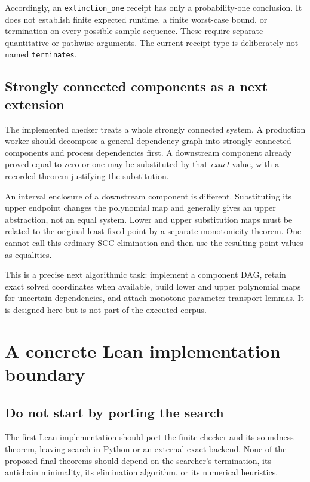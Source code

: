 \documentclass[11pt,a4paper]{article}
\theoremstyle{definition}\newtheorem{definition}[theorem]{Definition}
\theoremstyle{remark}\newtheorem{remark}[theorem]{Remark}
\newcommand{\code}[1]{\nolinkurl{#1}}
\begin{document}
Accordingly, an \code{extinction_one} receipt has only a probability-one conclusion. It does not establish finite expected runtime, a finite worst-case bound, or termination on every possible sample sequence. These require separate quantitative or pathwise arguments. The current receipt type is deliberately not named \code{terminates}.

\subsection{Strongly connected components as a next extension}
The implemented checker treats a whole strongly connected system. A production worker should decompose a general dependency graph into strongly connected components and process dependencies first. A downstream component already proved equal to zero or one may be substituted by that \emph{exact} value, with a recorded theorem justifying the substitution.

An interval enclosure of a downstream component is different. Substituting its upper endpoint changes the polynomial map and generally gives an upper abstraction, not an equal system. Lower and upper substitution maps must be related to the original least fixed point by a separate monotonicity theorem. One cannot call this ordinary SCC elimination and then use the resulting point values as equalities.

This is a precise next algorithmic task: implement a component DAG, retain exact solved coordinates when available, build lower and upper polynomial maps for uncertain dependencies, and attach monotone parameter-transport lemmas. It is designed here but is not part of the executed corpus.



\section{A concrete Lean implementation boundary}
\label{sec:integration}
\subsection{Do not start by porting the search}
The first Lean implementation should port the finite checker and its soundness theorem, leaving search in Python or an external exact backend. None of the proposed final theorems should depend on the searcher's termination, its antichain minimality, its elimination algorithm, or its numerical heuristics.
\end{document}
